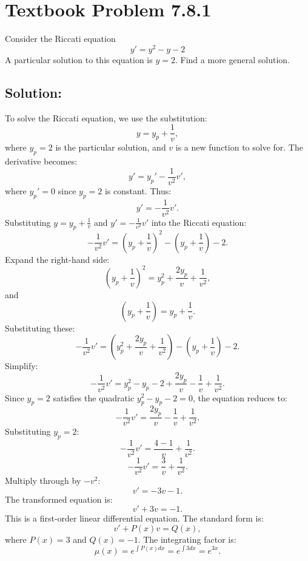 \documentclass[12pt]{article}
\begin{document}
\section*{Textbook Problem 7.8.1}
    Consider the Riccati equation 
    \[
        y' = y^2 - y - 2
    \]
    A particular solution to this equation is $y=2$. Find a more general solution.

    \subsection*{Solution:}
        To solve the Riccati equation, we use the substitution:
        \[
        y = y_p + \frac{1}{v},
        \]
        where \(y_p = 2\) is the particular solution, and \(v\) is a new function to solve for.
        The derivative becomes:
        \[
        y' = y_p' - \frac{1}{v^2}v',
        \]
        where \(y_p' = 0\) since \(y_p = 2\) is constant. Thus:
        \[
        y' = -\frac{1}{v^2}v'.
        \]
        Substituting \(y = y_p + \frac{1}{v}\) and \(y' = -\frac{1}{v^2}v'\) into the Riccati equation:
        \[
        -\frac{1}{v^2}v' = \left(y_p + \frac{1}{v}\right)^2 - \left(y_p + \frac{1}{v}\right) - 2.
        \]
        Expand the right-hand side:
        \[
        \left(y_p + \frac{1}{v}\right)^2 = y_p^2 + \frac{2y_p}{v} + \frac{1}{v^2},
        \]
        and
        \[
        \left(y_p + \frac{1}{v}\right) = y_p + \frac{1}{v}.
        \]
        Substituting these:
        \[
        -\frac{1}{v^2}v' = \left(y_p^2 + \frac{2y_p}{v} + \frac{1}{v^2}\right) - \left(y_p + \frac{1}{v}\right) - 2.
        \]
        Simplify:
        \[
        -\frac{1}{v^2}v' = y_p^2 - y_p - 2 + \frac{2y_p}{v} - \frac{1}{v} + \frac{1}{v^2}.
        \]
        Since \(y_p = 2\) satisfies the quadratic \(y_p^2 - y_p - 2 = 0\), the equation reduces to:
        \[
        -\frac{1}{v^2}v' = \frac{2y_p}{v} - \frac{1}{v} + \frac{1}{v^2}.
        \]
        Substituting \(y_p = 2\):
        \[
        -\frac{1}{v^2}v' = \frac{4 - 1}{v} + \frac{1}{v^2}.
        \]
        \[
        -\frac{1}{v^2}v' = \frac{3}{v} + \frac{1}{v^2}.
        \]
        Multiply through by \(-v^2\):
        \[
        v' = -3v - 1.
        \]
        The transformed equation is:
        \[
        v' + 3v = -1.
        \]
        This is a first-order linear differential equation. The standard form is:
        \[
        v' + P(x)v = Q(x),
        \]
        where \(P(x) = 3\) and \(Q(x) = -1\).
        The integrating factor is:
        \[
        \mu(x) = e^{\int P(x)dx} = e^{\int 3dx} = e^{3x}.
        \]
\end{document}
